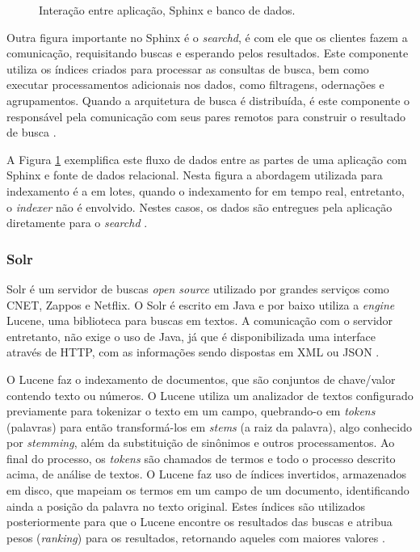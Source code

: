 \documentclass[diss]{template/setrem}
\begin{document}
\begin{figure}[!h]
    \caption{Interação entre aplicação, Sphinx e banco de dados.}
    \label{fig:sphinx}
\end{figure}

Outra figura importante no Sphinx é o \emph{searchd}, é com ele que os clientes fazem a comunicação, requisitando buscas e esperando pelos resultados. Este componente utiliza os índices criados para processar as consultas de busca, bem como executar processamentos adicionais nos dados, como filtragens, odernações e agrupamentos. Quando a arquitetura de busca é distribuída, é este componente o responsável pela comunicação com seus pares remotos para construir o resultado de busca \citep{Aksyonoff2011}.

A Figura \ref{fig:sphinx} exemplifica este fluxo de dados entre as partes de uma aplicação com Sphinx e fonte de dados relacional. Nesta figura a abordagem utilizada para indexamento é a em lotes, quando o indexamento for em tempo real, entretanto, o \emph{indexer} não é envolvido. Nestes casos, os dados são entregues pela aplicação diretamente para o \emph{searchd} \citep{Aksyonoff2011}.

\subsubsection{Solr}
Solr é um servidor de buscas \emph{open source} utilizado por grandes serviços como CNET, Zappos e Netflix. O Solr é escrito em Java e por baixo utiliza a \emph{engine} Lucene, uma biblioteca para buscas em textos. A comunicação com o servidor entretanto, não exige o uso de Java, já que é disponibilizada uma interface através de HTTP, com as informações sendo dispostas em XML ou JSON \citep{Smiley2011}.

O Lucene faz o indexamento de documentos, que são conjuntos de chave/valor contendo texto ou números. O Lucene utiliza um analizador de textos configurado previamente para tokenizar o texto em um campo, quebrando-o em \emph{tokens} (palavras) para então transformá-los em \emph{stems} (a raiz da palavra), algo conhecido por \emph{stemming}, além da substituição de sinônimos e outros processamentos. Ao final do processo, os \emph{tokens} são chamados de termos e todo o processo descrito acima, de análise de textos. O Lucene faz uso de índices invertidos, armazenados em disco, que mapeiam os termos em um campo de um documento, identificando ainda a posição da palavra no texto original. Estes índices são utilizados posteriormente para que o Lucene encontre os resultados das buscas e atribua pesos (\emph{ranking}) para os resultados, retornando aqueles com maiores valores \citep{Smiley2011}.
\end{document}
